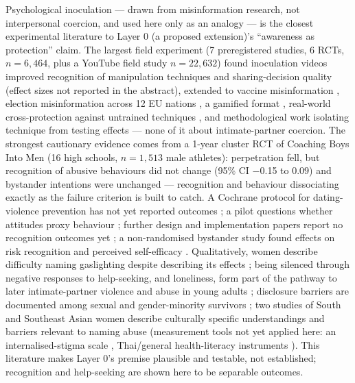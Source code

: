 Psychological inoculation --- drawn from misinformation research, not interpersonal coercion, and used here only as an analogy --- is the closest experimental literature to Layer 0 (a proposed extension)'s ``awareness as protection'' claim. The largest field experiment (7 preregistered studies, 6 RCTs, $n=6{,}464$, plus a YouTube field study $n=22{,}632$) found inoculation videos improved recognition of manipulation techniques and sharing-decision quality \cite{ref182} (effect sizes not reported in the abstract), extended to vaccine misinformation \cite{ref183}, election misinformation across 12 EU nations \cite{ref184}, a gamified format \cite{ref185}, real-world cross-protection against untrained techniques \cite{ref186}, and methodological work isolating technique from testing effects \cite{ref187} --- none of it about intimate-partner coercion. The strongest cautionary evidence comes from a 1-year cluster RCT of Coaching Boys Into Men (16 high schools, $n=1{,}513$ male athletes): perpetration fell, but recognition of abusive behaviours did not change (95\% CI $-$0.15 to 0.09) and bystander intentions were unchanged \cite{ref190} --- recognition and behaviour dissociating exactly as the failure criterion is built to catch. A Cochrane protocol for dating-violence prevention has not yet reported outcomes \cite{ref188}; a pilot questions whether attitudes proxy behaviour \cite{ref189}; further design and implementation papers report no recognition outcomes yet \cite{ref191,ref192}; a non-randomised bystander study found effects on risk recognition and perceived self-efficacy \cite{ref193}. Qualitatively, women describe difficulty naming gaslighting despite describing its effects \cite{ref194}; being silenced through negative responses to help-seeking, and loneliness, form part of the pathway to later intimate-partner violence and abuse in young adults \cite{ref195}; disclosure barriers are documented among sexual and gender-minority survivors \cite{ref196}; two studies of South and Southeast Asian women describe culturally specific understandings and barriers relevant to naming abuse \cite{ref200,ref201} (measurement tools not yet applied here: an internalised-stigma scale \cite{ref197}, Thai/general health-literacy instruments \cite{ref198,ref199}). This literature makes Layer 0's premise plausible and testable, not established; recognition and help-seeking are shown here to be separable outcomes.

